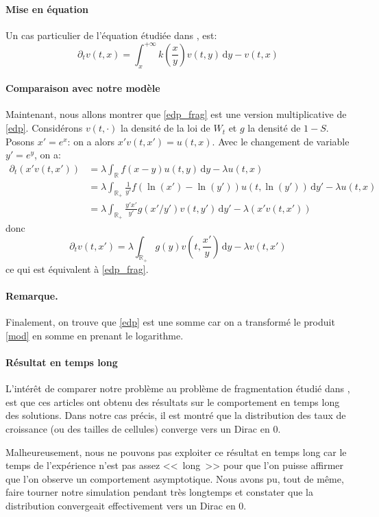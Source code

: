 \documentclass[12pt]{article}
\newcounter{thm}
\newcommand{\req}[1]{\paragraph{Remarque.}#1\vspace{0.1cm}}
\newcommand{\pth}[1]{\left(#1\right)}
\newcommand{\Er}{\mathbb{R}}
\newcommand{\de}{\,\mathrm{d}}
\newcommand{\dr}{\partial}
\begin{document}
\paragraph{Mise en équation} 

Un cas particulier de l'équation étudiée dans \cite{md1}, \cite{md2} est:
\begin{equation}\label{edp_frag}
\dr_tv(t,x)=\int_x^{+\infty}k\pth{\frac{x}{y}}v(t,y)\de y-v(t,x)
\end{equation}


\paragraph{Comparaison avec notre modèle}

Maintenant, nous allons montrer que \eqref{edp_frag} est une version multiplicative de \eqref{edp}.  Considérons $v(t,\cdot)$ la densité de la loi de $W_t$ et $g$ la densité de $1-S$. Posons $x'=e^x$: on a alors $x'v(t,x')=u(t,x)$. Avec le changement de variable $y'=e^y$, on a:
\begin{align*}
  \dr_t(x'v(t,x'))
  &=\lambda\int_{\Er}f(x-y)u(t,y)\de y-\lambda u(t,x)\\
  &=\lambda\int_{\Er_+}\frac{1}{y'}f(\ln(x')-\ln(y'))u(t,\ln(y'))\de y'-\lambda u(t,x)\\
  &=\lambda\int_{\Er_+}\frac{y'x'}{y'}g(x'/y')v\pth{t,y'}\de y'-\lambda\pth{x'v(t,x')}
\end{align*}
donc 
\[\dr_tv(t,x')=\lambda\int_{\Er_+}g(y)v\pth{t,\frac{x'}{y}}\de y-\lambda v(t,x')\]
ce qui est équivalent à \eqref{edp_frag}.

\req{Finalement, on trouve que \eqref{edp} est une somme car on a transformé le produit \eqref{mod} en somme en prenant le logarithme.}


\paragraph{Résultat en temps long} L'intérêt de comparer notre problème au problème de fragmentation étudié dans \cite{md1}, \cite{md2} est que ces articles ont obtenu des résultats sur le comportement en temps long des solutions. Dans notre cas précis, il est montré que la distribution des taux de croissance (ou des tailles de cellules) converge vers un Dirac en 0. 

Malheureusement, nous ne pouvons pas exploiter ce résultat en temps long car le temps de l'expérience n'est pas assez <<~long~>> pour que l'on puisse affirmer que l'on observe un comportement asymptotique. Nous avons pu, tout de même, faire tourner notre simulation pendant très longtemps et constater que la distribution convergeait effectivement vers un Dirac en 0.
\end{document}
